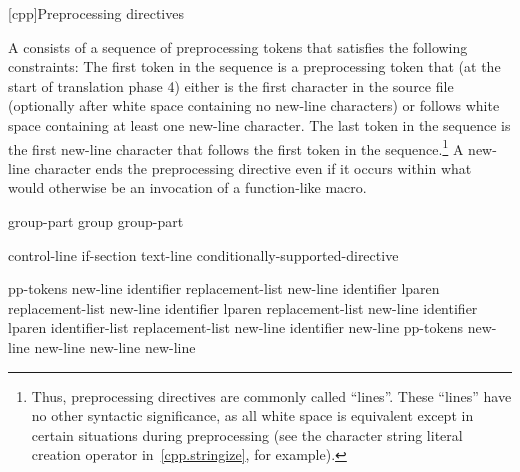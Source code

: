 [cpp]{Preprocessing directives}%

%
%


\pnum
A  consists of a sequence of preprocessing tokens
that satisfies the following constraints:
The first token in the sequence is a
\tcode{\#}
preprocessing token that (at the start of translation phase 4)
either is the first character in the source file
(optionally after white space containing no new-line characters)
or follows white space containing at least one new-line character.
The last token in the sequence is the first new-line character
that follows the first token in the sequence.\footnote{Thus,
preprocessing directives are commonly called ``lines''.
These ``lines'' have no other syntactic significance,
as all white space is equivalent except in certain situations
during preprocessing (see the
\tcode{\#}
character string literal creation operator in~\ref{cpp.stringize}, for example).}
A new-line character ends the preprocessing directive even if it occurs
within what would otherwise be an invocation of a function-like macro.

\begin{bnf}
\br
\end{bnf}

\begin{bnf}
\br
    group-part\br
    group group-part
\end{bnf}

\begin{bnf}
\br
    control-line\br
    if-section\br
    text-line\br
    \terminal{\#} conditionally-supported-directive
\end{bnf}

\begin{bnf}\obeyspaces
{}\br
     pp-tokens new-line\br
     identifier replacement-list new-line\br
     identifier lparen  \terminal{)} replacement-list new-line\br
     identifier lparen  replacement-list new-line\br
     identifier lparen identifier-list  replacement-list new-line\br
     identifier new-line\br
     pp-tokens new-line\br
      new-line\br
      new-line\br
    \terminal{\# }new-line
\end{bnf}

